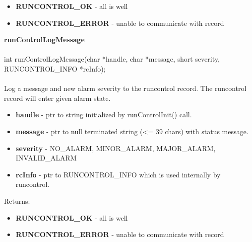 \documentclass[11pt]{article}
\begin{document}
\begin{itemize}
  \item {\bf RUNCONTROL\_OK} - all is well
  \item {\bf RUNCONTROL\_ERROR} - unable to communicate with record
\end{itemize}
{\bf runControlLogMessage}\\
\\
int runControlLogMessage(char *handle, char *message, short severity, RUNCONTROL\_INFO *rcInfo);\\
\\
Log a message and new alarm severity to the runcontrol record. The runcontrol record will enter given alarm state.

\begin{itemize}
  \item {\bf handle} - ptr to string initialized by runControlInit() call.
  \item {\bf message} - ptr to null terminated string (<= 39 chars) with status message.
  \item {\bf severity} - NO\_ALARM, MINOR\_ALARM, MAJOR\_ALARM, INVALID\_ALARM
  \item {\bf rcInfo} - ptr to RUNCONTROL\_INFO which is used internally by runcontrol.
\end{itemize}
Returns:

\begin{itemize}
  \item {\bf RUNCONTROL\_OK} - all is well
  \item {\bf RUNCONTROL\_ERROR} - unable to communicate with record
\end{itemize}
\end{document}
